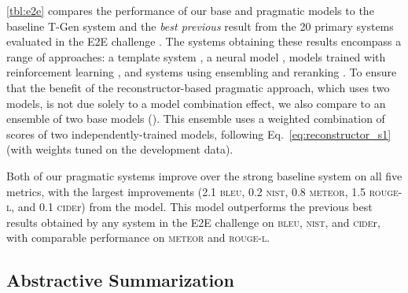\documentclass[11pt,a4paper]{article}
\newcommand{\basespk}[0]{\xspace}
\newcommand{\pragr}[0]{\xspace}
\newcommand{\bleu}{\textsc{bleu}\xspace}
\newcommand{\nist}{\textsc{nist}\xspace}
\newcommand{\meteor}{\textsc{meteor}\xspace}
\newcommand{\cider}{\textsc{cide}r\xspace}
\newcommand{\rougel}{\textsc{rouge-l}\xspace}
\begin{document}
\autoref{tbl:e2e} compares the performance of our base \basespk and pragmatic models to the baseline T-Gen system \cite{duvsek2016sequence} and the \emph{best previous} result from the 20 primary systems evaluated in the E2E challenge \cite{duvsek2018findings}. The systems obtaining these results encompass a range of approaches: a template system \cite{puzikov2018e2e}, a neural model \cite{zhang2018e2e}, models trained with reinforcement learning \cite{gong2018e2e}, and systems using ensembling and reranking \cite{juraska2018ensemble}.
To ensure that the benefit of the reconstructor-based pragmatic approach, which uses two models, is not due solely to a model combination effect, we also compare to an ensemble of two base models (\basespk ). This ensemble uses a weighted combination of scores of two independently-trained \basespk models, following Eq.\ \ref{eq:reconstructor_s1} (with weights tuned on the development data).


Both of our pragmatic systems improve over the strong baseline \basespk system 
on all five metrics, with the largest improvements (2.1 \bleu, 
0.2 \nist,
0.8 \meteor, 1.5 \rougel, and 
0.1 \cider)
from the \pragr model. This \pragr model outperforms the previous best results obtained by any system in the E2E challenge on \bleu, \nist, and \cider, with comparable performance on \meteor and \rougel.

\subsection{Abstractive Summarization}
\end{document}
